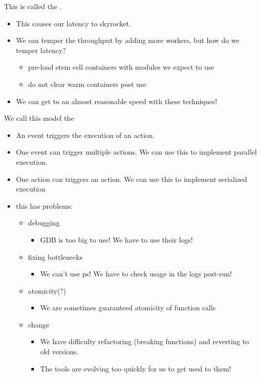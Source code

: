 \documentclass[../../lecture_notes.tex]{subfiles}
\begin{document}
This is called the .
	\begin{itemize}
		\item This causes our latency to skyrocket.
		\item We can temper the throughput by adding more workers, but how do we temper latency?
			\begin{itemize}
				\item pre-load stem cell containers with modules we expect to use
				\item do not clear warm containers post use
			\end{itemize}
		\item We can get to an almost reasonable speed with these techniques!
	\end{itemize}
	
We call this model the 
\begin{itemize}
	\item An event triggers the execution of an action.
	\item One event can trigger multiple actions. We can use this to implement parallel execution.
	\item One action can triggers an action. We can use this to implement serialized execution
	\item this has problems:
		\begin{itemize}
			\item debugging
				\begin{itemize}
					\item GDB is too big to use! We have to use their logs!
				\end{itemize}
			\item fixing bottlenecks
				\begin{itemize}
					\item We can’t use ps! We have to check usage in the logs post-run!
				\end{itemize}
			\item atomicity(?)
				\begin{itemize}
					\item We are sometimes guaranteed atomicity of function calls
				\end{itemize}
			\item change
				\begin{itemize}
					\item We have difficulty refactoring (breaking functions) and reverting to old versions.
					\item The tools are evolving too quickly for us to get used to them!
				\end{itemize}
		\end{itemize}
\end{itemize}
\end{document}
